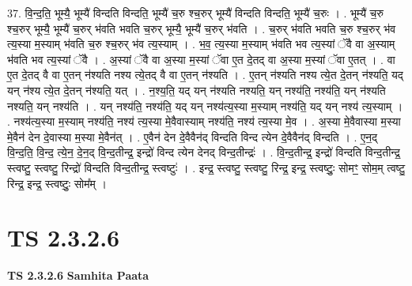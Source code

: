 \documentclass[17pt]{extarticle}
\begin{document}
37. वि॒न्द॒ति॒ भूम्यै॒ भूम्यै॑ विन्दति विन्दति॒ भूम्यै॑ च॒रु श्च॒रुर् भूम्यै॑ विन्दति विन्दति॒ भूम्यै॑ च॒रुः । . भूम्यै॑ च॒रु श्च॒रुर् भूम्यै॒ भूम्यै॑ च॒रुर् भ॑वति भवति च॒रुर् भूम्यै॒ भूम्यै॑ च॒रुर् भ॑वति । . च॒रुर् भ॑वति भवति च॒रु श्च॒रुर् भ॑व त्य॒स्या म॒स्याम् भ॑वति च॒रु श्च॒रुर् भ॑व त्य॒स्याम् । . भ॒व॒ त्य॒स्या म॒स्याम् भ॑वति भव त्य॒स्यां ॅवै वा अ॒स्याम् भ॑वति भव त्य॒स्यां ॅवै । . अ॒स्यां ॅवै वा अ॒स्या म॒स्यां ॅवा ए॒त दे॒तद् वा अ॒स्या म॒स्यां ॅवा ए॒तत् । . वा ए॒त दे॒तद् वै वा ए॒तन् न॑श्यति नश्य त्ये॒तद् वै वा ए॒तन् न॑श्यति । . ए॒तन् न॑श्यति नश्य त्ये॒त दे॒तन् न॑श्यति॒ यद् यन् न॑श्य त्ये॒त दे॒तन् न॑श्यति॒ यत् । . न॒श्य॒ति॒ यद् यन् न॑श्यति नश्यति॒ यन् नश्य॑ति॒ नश्य॑ति॒ यन् न॑श्यति नश्यति॒ यन् नश्य॑ति । . यन् नश्य॑ति॒ नश्य॑ति॒ यद् यन् नश्य॑त्य॒स्या म॒स्याम् नश्य॑ति॒ यद् यन् नश्य॑ त्य॒स्याम् । . नश्य॑त्य॒स्या म॒स्याम् नश्य॑ति॒ नश्य॑ त्य॒स्या मे॒वैवास्याम् नश्य॑ति॒ नश्य॑ त्य॒स्या मे॒व । . अ॒स्या मे॒वैवास्या म॒स्या मे॒वैन॑ देन दे॒वास्या म॒स्या मे॒वैन॑त् । . ए॒वैन॑ देन दे॒वैवैन॑द् विन्दति विन्द त्येन दे॒वैवैन॑द् विन्दति । . ए॒न॒द् वि॒न्द॒ति॒ वि॒न्द॒ त्ये॒न॒ दे॒न॒द् वि॒न्द॒तीन्द्र॒ इन्द्रो॑ विन्द त्येन देनद् विन्द॒तीन्द्रः॑ । . वि॒न्द॒तीन्द्र॒ इन्द्रो॑ विन्दति विन्द॒तीन्द्र॒ स्त्वष्टु॒ स्त्वष्टु॒ रिन्द्रो॑ विन्दति विन्द॒तीन्द्र॒ स्त्वष्टुः॑ । . इन्द्र॒ स्त्वष्टु॒ स्त्वष्टु॒ रिन्द्र॒ इन्द्र॒ स्त्वष्टुः॒ सोमꣳ॒॒ सोम॒म् त्वष्टु॒ रिन्द्र॒ इन्द्र॒ स्त्वष्टुः॒ सोम᳚म् । \newline
\pagebreak
{}

\section{ TS 2.3.2.6 }

\textbf{TS 2.3.2.6 } \newline
\textbf{Samhita Paata} \newline
\end{document}
